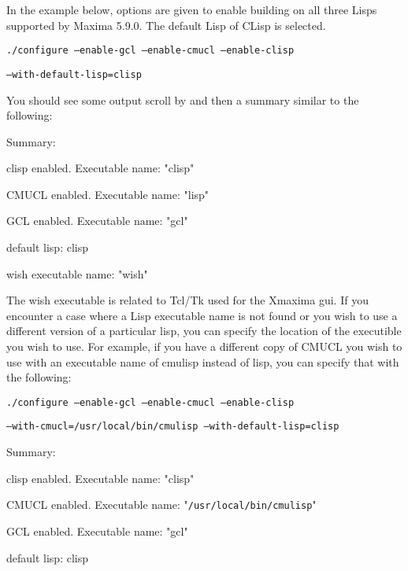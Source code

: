 In the example below, options are given to enable building on all three Lisps
supported by Maxima 5.9.0.  The default Lisp of CLisp is selected.

\vspace{3ex}


\texttt{./configure --enable-gcl --enable-cmucl --enable-clisp }

\texttt{--with-default-lisp=clisp}

\vspace{3ex}


You should see some output scroll by and then a summary similar to the 
following:

\vspace{3ex}%

Summary:

clisp enabled. Executable name: "clisp"

CMUCL enabled. Executable name: "lisp"

GCL enabled. Executable name: "gcl"

default lisp: clisp

wish executable name: "wish"

\vspace{3ex}%

The wish executable is related to Tcl/Tk used for the Xmaxima gui.  If you 
encounter a case where a Lisp executable name is not found or you wish to
use a different version of a particular lisp, you can specify the location
of the executible you wish to use.  For example, if you have a different 
copy of CMUCL you wish to use with an executable name of cmulisp instead of
lisp, you can specify that with the following:


\vspace{3ex}

\texttt{./configure --enable-gcl --enable-cmucl --enable-clisp}

\texttt{--with-cmucl=/usr/local/bin/cmulisp --with-default-lisp=clisp}

\vspace{3ex}

Summary:

clisp enabled. Executable name: "clisp"

CMUCL enabled. Executable name: "\texttt{/usr/local/bin/cmulisp}"

GCL enabled. Executable name: "gcl"

default lisp: clisp

